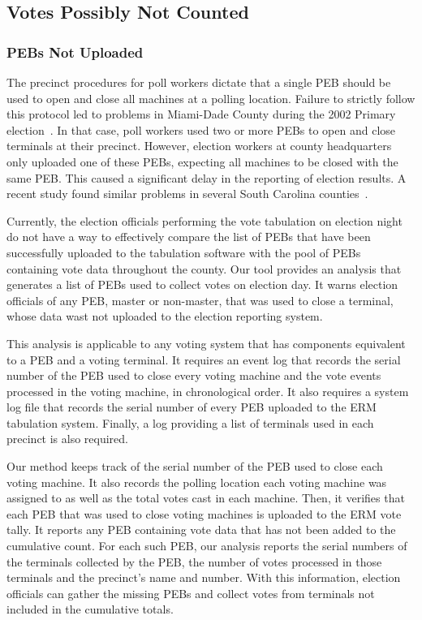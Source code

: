 \subsection{Votes Possibly Not Counted}
\subsubsection{PEBs Not Uploaded}
The precinct procedures for poll workers dictate that a single PEB
should be used to open and close all machines at a polling
location. Failure to strictly follow this protocol led to problems in
Miami-Dade County during the 2002 Primary
election~\cite{Mazella2002}. In that case, poll workers used two or
more PEBs to open and close terminals at their precinct.  However,
election workers at county headquarters only uploaded one of these
PEBs, expecting all machines to be closed with the same PEB. This
caused a significant delay in the reporting of election results. A
recent study found similar problems in several South Carolina
counties~\cite{Buell2011}.

Currently, the election officials performing the vote tabulation on
election night do not have a way to effectively compare the list of
PEBs that have been successfully uploaded to the tabulation software
with the pool of PEBs containing vote data throughout the county. Our
tool provides an analysis that generates a list of PEBs used to collect
votes on election day. It warns election officials of any PEB, master
or non-master, that was used to close a terminal, whose data wast not
uploaded to the election reporting system.  

This analysis is applicable to any voting system that has components
equivalent to a PEB and a voting terminal.  It requires an event log
that records the serial number of the PEB used to close every voting
machine and the vote events processed in the voting machine, in
chronological order. It also requires a system log file that records the
serial number of every PEB uploaded to the ERM tabulation
system. Finally, a log providing a list of terminals used in each
precinct is also required.

Our method keeps track of the serial number of the PEB used to close each voting machine. It also records the polling location each voting machine was assigned to as well as the total votes cast in each machine. Then, it verifies that each PEB that was used to close voting machines is uploaded to the ERM vote tally. It reports any PEB containing vote data that has not been added to the cumulative count.  For each such PEB, our analysis reports the serial numbers of the terminals collected by the PEB, the number of votes processed in those terminals and the precinct's name and number. With this information, election officials can gather the missing PEBs and collect votes from terminals not included in the cumulative totals.

